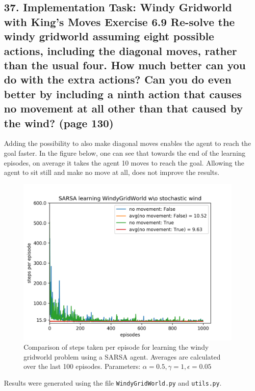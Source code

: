 \subsection*{37. Implementation Task: Windy Gridworld with King's Moves Exercise 6.9 Re-solve the windy gridworld assuming eight possible actions, including the diagonal moves, rather than the usual four. How much better can you do with the extra actions? Can you do even better by including a ninth action that causes no movement at all other than that caused by the wind? (page 130)}
Adding the possibility to also make diagonal moves enables the agent to reach the goal faster. In the figure below, one can see that towards the end of the learning episodes, on average it takes the agent 10 moves to reach the goal.
Allowing the agent to sit still and make no move at all, does not improve the results.
\begin{figure}[H]
\centering
\captionsetup{width=.5\linewidth}
\includegraphics[width=.5\linewidth]{./WindyGridWorld_non_stochastic_wind.png}
\caption{Comparison of steps taken per episode for learning the windy gridworld problem using a SARSA agent. Averages are calculated over the last 100 episodes. Parameters: $\alpha = 0.5, \gamma = 1, \epsilon = 0.05$}
\end{figure}
Results were generated using the file \texttt{WindyGridWorld.py} and \texttt{utils.py}.

